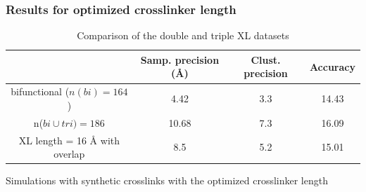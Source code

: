\documentclass[a4paper,8pt]{beamer}
\begin{document}
\begin{frame}
\frametitle{Results for optimized crosslinker length}
\begin{table}
  \centering
  \caption{Comparison of the double and triple XL datasets}
  \begin{tabular}{|c|c|c|c|}
      \hline
                                   & Samp. precision ({\AA}) & Clust. precision & Accuracy\\ \hline
      bifunctional ($n(bi) = 164$) & 4.42  & 3.3 & 14.43 \\\hline
      n($bi \cup tri) = 186$       & 10.68 & 7.3 &  16.09 \\\hline
      XL length = 16 {\AA} with overlap & 8.5   & 5.2 & 15.01 \\\hline
  \end{tabular}
\end{table}
\begin{block}{}
  Simulations with synthetic crosslinks with the optimized crosslinker length
\end{block}
\end{frame}
\end{document}
